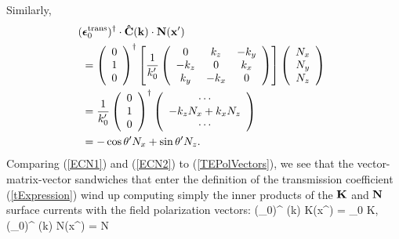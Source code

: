 \documentclass[letterpaper]{article}
\newcommand{\vbEps}{\boldsymbol{\epsilon}}
\begin{document}
Similarly, 
\begin{align}
&\hspace{-0.05in}
 (\vbEps_0\sups{trans})^\dagger \cdot
 \vbhat{C}(\vb k) \cdot \vb N(\vb x^\prime)
\nn
&=
 \left(\begin{array}{c}0 \\ 1 \\ 0\end{array}\right)^\dagger
 \left[ \frac{1}{k_0^{\prime}}
        \left(\begin{array}{ccc}
               0       & k_z     & -k_y    \\
               -k_z    & 0       & k_x     \\
               k_y     & -k_x    & 0
              \end{array}
        \right)
 \right]
 \left(\begin{array}{c}N_x \\ N_y \\ N_z\end{array}\right)
\nn
&=
 \frac{1}{k_0^\prime}
 \left(\begin{array}{c}0 \\ 1 \\ 0\end{array}\right)^\dagger
 \left(\begin{array}{c} \cdots \\ -k_z N_x + k_x N_z \\ \cdots
       \end{array}\right)
\nn
&=-\cos\theta^\prime N_x + \sin\theta^\prime N_z.
\label{ECN2}
\end{align}
Comparing (\ref{ECN1}) and (\ref{ECN2}) to (\ref{TEPolVectors}),
we see that the 
vector-matrix-vector sandwiches that enter the definition of 
the transmission coefficient (\ref{tExpression}) wind up 
computing simply the inner products of the $\mathbf{K}$ and $\mathbf{N}$
surface currents with the field polarization vectors: 
{
(\vbEps_0)^\dagger
    \cdot
    (\vb k)
    \cdot
    \vb K(\vb x^\prime)
   = \vbEps_0 \cdot \vb K, 
   \qquad
   (\vbEps_0)^\dagger
    \cdot
    (\vb k)
    \cdot
    \vb N(\vb x^\prime)
   = \overline{\vbEps_0} \cdot \vb N
}
\end{document}
